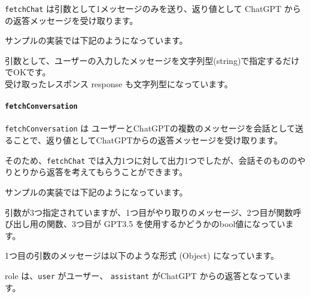 \texttt{fetchChat} は引数として1メッセージのみを送り、返り値として
ChatGPT からの返答メッセージを受け取ります。

サンプルの実装では下記のようになっています。

\begin{Shaded}
\begin{Highlighting}[]
\OperatorTok{=}  \NormalTok{)}\OperatorTok{;}
\end{Highlighting}
\end{Shaded}

引数として、ユーザーの入力したメッセージを文字列型(string)で指定するだけでOKです。\\
受け取ったレスポンス response も文字列型になっています。

\paragraph{\texorpdfstring{\texttt{fetchConversation}}{fetchConversation}}\label{fetchconversation}

\texttt{fetchConversation} は
ユーザーとChatGPTの複数のメッセージを会話として送ることで、返り値としてChatGPTからの返答メッセージを受け取ります。

そのため、\texttt{fetchChat}
では入力1つに対して出力1つでしたが、会話そのもののやりとりから返答を考えてもらうことができます。

サンプルの実装では下記のようになっています。

\begin{Shaded}
\begin{Highlighting}[]
\OperatorTok{=}  \OperatorTok{,} \OperatorTok{,} \NormalTok{)}\OperatorTok{;}
\end{Highlighting}
\end{Shaded}

引数が3つ指定されていますが、1つ目がやり取りのメッセージ、2つ目が関数呼び出し用の関数、3つ目が
GPT3.5 を使用するかどうかのbool値になっています。

1つ目の引数のメッセージは以下のような形式 (Object) になっています。

role は、\texttt{user} がユーザー、 \texttt{assistant} がChatGPT
からの返答となっています。


